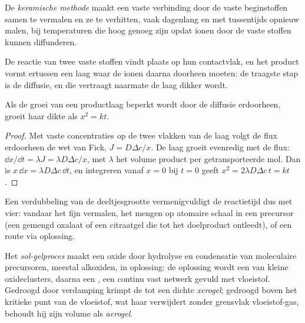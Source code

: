 \begin{definition}\label{def:b3:inorganic-materials:ceramic-method}
De \emph{keramische methode} maakt een vaste
verbinding door de vaste beginstoffen samen te vermalen en ze te
verhitten, vaak dagenlang en met tussentijds opnieuw malen, bij
temperaturen die hoog genoeg zijn opdat ionen door de vaste stoffen
kunnen diffunderen.
\end{definition}

De reactie van twee vaste stoffen vindt plaats op hun contactvlak, en het
product vormt ertussen een laag waar de ionen daarna doorheen moeten: de
traagste stap is de diffusie, en die vertraagt naarmate de laag dikker
wordt.

\begin{proposition}\label{prop:b3:inorganic-materials:parabolic}
Als de groei van een productlaag beperkt wordt door de diffusie erdoorheen,
groeit haar dikte als $x^2 = kt$.
\end{proposition}

\begin{proof}
Met vaste concentraties op de twee vlakken van de laag volgt de flux
erdoorheen de wet van Fick, $J = D\Delta c/x$. De laag groeit evenredig met de flux:
$\dd x/\dd t = \lambda J = \lambda D\Delta c/x$, met $\lambda$ het volume product per getransporteerde mol. Dan is
$x\,\dd x = \lambda D\Delta c\,\dd t$, en integreren vanaf $x = 0$ bij $t = 0$ geeft $x^2 = 2\lambda D\Delta c\,t = kt$.
\end{proof}

Een verdubbeling van de deeltjesgrootte vermenigvuldigt de reactietijd
dus met vier: vandaar het fijn vermalen, het mengen op atomaire schaal in
een precursor (een gemengd oxalaat of een citraatgel die tot het
doelproduct ontleedt), of een route via oplossing.

\begin{definition}\label{def:b3:inorganic-materials:sol-gel}
Het \emph{sol-gelproces} maakt een oxide door
hydrolyse en condensatie van moleculaire precursoren, meestal alkoxiden,
in oplossing: de oplossing wordt een  van kleine oxideclusters, daarna
een , een continu vast netwerk gevuld met vloeistof. Gedroogd door
verdamping krimpt de  tot een dichte \emph{xerogel};
gedroogd boven het kritieke punt van de vloeistof, wat haar verwijdert
zonder grensvlak vloeistof-gas, behoudt hij zijn volume als
\emph{aerogel}.
\end{definition}

